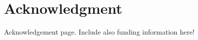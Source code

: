 \chapter*{Acknowledgment}
\vspace{5 mm}

% 
Acknowledgement page. Include also funding information here!
% 

\newpage
\thispagestyle{empty}
